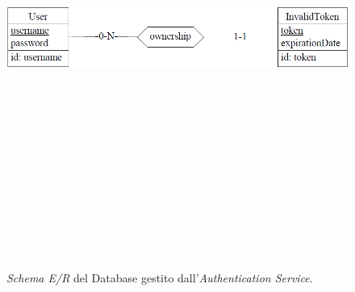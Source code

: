 \begin{figure}
  \centering
  \includegraphics[height=15cm, width=12cm,
		keepaspectratio]{images/AuthenticationServiceER.PNG}
  \caption{\textit{Schema E/R} del Database gestito dall'\textit{Authentication Service}.}
  \label{fig:authentication-service-er-schema}
\end{figure}
